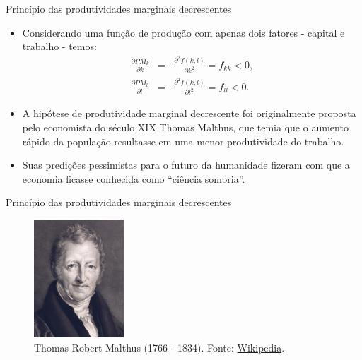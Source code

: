 \documentclass[10pt]{beamer}
\begin{document}
\begin{frame}{Princípio das produtividades marginais decrescentes}
    \begin{itemize}
        \item Considerando uma função de produção com apenas dois fatores - capital e trabalho - temos:
        \begin{eqnarray*}
            \frac{\partial PM_k}{\partial k} &=& \frac{\partial^2 f(k,l)}{\partial k^2} = f_{kk} < 0, \\
            \frac{\partial PM_l}{\partial l} &=& \frac{\partial^2 f(k,l)}{\partial l^2} = f_{ll} < 0.
        \end{eqnarray*}
         
        \item A hipótese de produtividade marginal decrescente foi originalmente proposta pelo economista do século XIX Thomas Malthus, que temia que o aumento rápido da população resultasse em uma menor produtividade do trabalho.
        \bigskip
        \item Suas predições pessimistas para o futuro da humanidade fizeram com que a economia ficasse conhecida como ``ciência sombria''.
    \end{itemize}
\end{frame}

\begin{frame}{Princípio das produtividades marginais decrescentes}
    \begin{figure}
        \centering
        \includegraphics[width=0.3\textwidth]{./figures/aula14_fig2.jpg}
        \caption{Thomas Robert Malthus (1766 - 1834). Fonte: \href{https://en.wikipedia.org/wiki/Thomas_Robert_Malthus}{Wikipedia}.}
        \label{fig3}
    \end{figure}
\end{frame}
\end{document}
